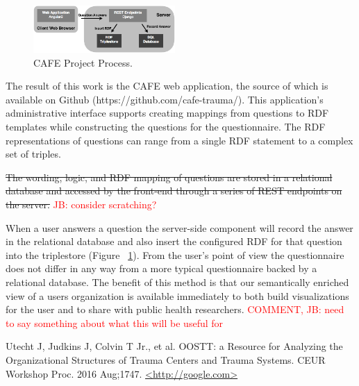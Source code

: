 \documentclass{amia}
\begin{document}
\begin{figure}
  \begin{center}
    \includegraphics[width=0.48\textwidth]{pics/cafe_process2.png}
  \end{center}
  \caption{CAFE Project Process.}
  \label{cafe_process}
\end{figure}

The result of this work is the CAFE web application, the source of which is available on Github (https://github.com/cafe-trauma/). 
This application's administrative interface supports creating mappings from questions to RDF templates while constructing the questions for the questionnaire. The RDF representations of questions can range from a single RDF statement to a complex set of triples.

\sout {The wording, logic, and RDF mapping of questions are stored in a relational database and accessed by the front-end through a series of REST endpoints on the server.}
\textcolor{red}{JB: consider scratching?}

When a user answers a question the server-side component will record the answer in the relational database and also insert the configured RDF for that question into the triplestore (Figure ~\ref{cafe_process}).
From the user's point of view the questionnaire does not differ in any way from a more typical questionnaire backed by a relational database.
The benefit of this method is that our semantically enriched view of a users organization is available immediately to both build visualizations for the user and to share with public health researchers.
\textcolor{red}{COMMENT, JB: need to say something about what this will be useful for}


\makeatletter
\renewcommand{\@biblabel}[1]{\hfill #1.}
\makeatother


\begin{thebibliography}{1}
\setlength\itemsep{-0.1em}

Utecht J, Judkins J, Colvin T Jr., et al. OOSTT: a Resource for Analyzing the Organizational Structures of Trauma Centers and Trauma Systems. CEUR Workshop Proc. 2016 Aug;1747. \href{<http://google.com>}{<http://google.com>}

\end{thebibliography}
\end{document}
